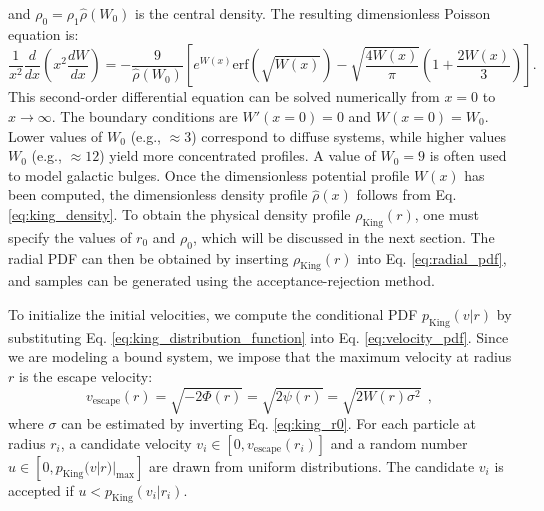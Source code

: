 \documentclass[fleqn,usenatbib]{mnras}
\begin{document}
and $\rho_0 = \rho_1 \hat{\rho}(W_0)$ is the central density.
The resulting dimensionless Poisson equation is:
{\fontsize{6.8pt}{6.8pt}\begin{equation}
    \dfrac{1}{x^2} \dfrac{d}{dx} \left(x^2 \dfrac{dW}{dx}\right) = 
    - \dfrac{9}{\hat{\rho}(W_0)} \left[ e^{W(x)} \text{erf}\left(\sqrt{W(x)}\right) - \sqrt{\dfrac{4 W(x)}{\pi}} \left(1+\dfrac{2 W(x)}{3}\right) \right] .
    \label{eq:king_poisson_dimensionless}
\end{equation}}
This second-order differential equation can be solved numerically from $x=0$ to $x \rightarrow \infty$.
The boundary conditions are $W'(x=0)=0$ and $W(x=0)=W_0$. 
Lower values of $W_0$ (e.g., $\approx 3$) correspond to diffuse systems, while higher values $W_0$ (e.g., $\approx 12$) yield more concentrated profiles. A value of $W_0 = 9$ is often used to model galactic bulges.
Once the dimensionless potential profile $W(x)$ has been computed, the dimensionless density profile $\hat{\rho}(x)$ follows from Eq. \ref{eq:king_density}.
To obtain the physical density profile $\rho_\text{King}(r)$, one must specify the values of $r_0$ and $\rho_0$, which will be discussed in the next section.
The radial PDF can then be obtained by inserting $\rho_\text{King}(r)$ into Eq. \ref{eq:radial_pdf}, and samples can be generated using the acceptance-rejection method.
\vspace{0.5em}

To initialize the initial velocities, we compute the conditional PDF $p_\text{King}(v|r)$ by substituting Eq. \ref{eq:king_distribution_function} into Eq. \ref{eq:velocity_pdf}.
Since we are modeling a bound system, we impose that the maximum velocity at radius $r$ is the escape velocity:
\begin{equation}
    v_\text{escape}(r)=\sqrt{-2\Phi(r)}=\sqrt{2\psi(r)}=\sqrt{2W(r) \sigma^2} \:\: ,
    \label{eq:king_escape_velocity}
\end{equation}
where $\sigma$ can be estimated by inverting Eq. \ref{eq:king_r0}.
For each particle at radius $r_i$, a candidate velocity $v_i \in [0, v_\text{escape}(r_i)]$ and a random number $u \in [0, p_\text{King}(v|r)|_\text{max}]$ are drawn from uniform distributions.
The candidate $v_i$ is accepted if $u < p_\text{King}(v_i|r_i)$.
\end{document}
